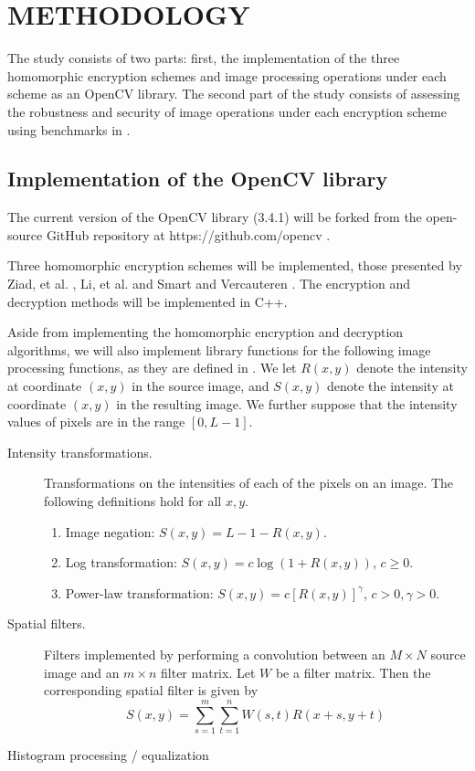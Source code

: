 \chapter{METHODOLOGY}

The study consists of two parts: first, the implementation of the three homomorphic encryption schemes and image processing operations under each scheme as an OpenCV library. The second part of the study consists of assessing the robustness and security of image operations under each encryption scheme using benchmarks in \cite{ahmed_benchmark_2016}.

\section{Implementation of the OpenCV library}

The current version of the OpenCV library (3.4.1) will be forked from the open-source GitHub repository at https://github.com/opencv \cite{opencv_library}.

Three homomorphic encryption schemes will be implemented, those presented by Ziad, et al. \cite{ziad_cryptoimg:_2016}, Li, et al. \cite{li_elliptic_2012} and Smart and Vercauteren \cite{hutchison_fully_2010}. The encryption and decryption methods will be implemented in C++.

Aside from implementing the homomorphic encryption and decryption algorithms, we will also implement library functions for the following image processing functions, as they are defined in \cite{gonzalez_digital_2008}. We let $R(x,y)$ denote the intensity at coordinate $(x,y)$ in the source image, and $S(x,y)$ denote the intensity at coordinate $(x,y)$ in the resulting image. We further suppose that the intensity values of pixels are in the range $[0, L-1]$.
\begin{description}
	\item[Intensity transformations.] Transformations on the intensities of each of the pixels on an image. The following definitions hold for all $x,y$.
	\begin{enumerate}
		\item Image negation: $S(x,y) = L - 1 - R(x,y)$.
		\item Log transformation: $S(x,y) = c\log{(1 + R(x,y))}$, $c \geq 0$.
		\item Power-law transformation: $S(x,y) = c[R(x,y)]^\gamma$, $c > 0, \gamma > 0$.
	\end{enumerate}
	\item[Spatial filters.] Filters implemented by performing a convolution between an $M\times N$ source image and an $m\times n$ filter matrix. Let $W$ be a filter matrix. Then the corresponding spatial filter is given by
	\begin{equation}
		S(x,y) = \sum_{s=1}^m{\sum_{t=1}^n{W(s,t)R(x+s,y+t)}}
	\end{equation}
	\item [Histogram processing / equalization]

\end{description}


